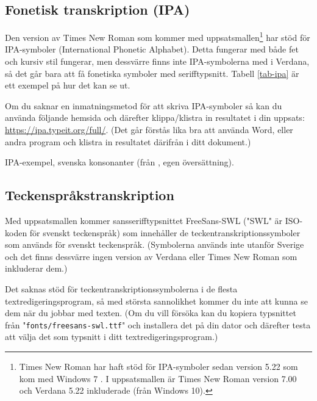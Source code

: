 \subsection{Fonetisk transkription (IPA)}
\label{ipa}

Den version av Times New Roman som kommer med uppsatsmallen\footnote{Times New
  Roman har haft stöd för IPA-symboler sedan version 5.22 \citep{ipa} som kom
  med Windows 7 \citep{win-7-fonts}. I uppsatsmallen är Times New Roman version
  7.00 och Verdana 5.22 inkluderade (från Windows 10).} har stöd för
IPA-symboler (International Phonetic Alphabet). Detta fungerar med både fet och
kursiv stil fungerar, men dessvärre finns inte IPA-symbolerna med i Verdana, så
det går bara att få fonetiska symboler med serifftypsnitt. Tabell
\ref{tab-ipa} är ett exempel på hur det kan se ut.

Om du saknar en inmatningsmetod för att skriva IPA-symboler så kan du använda
följande hemsida och därefter klippa/klistra in resultatet i din uppsats:
\url{https://ipa.typeit.org/full/}. (Det går förstås lika bra att använda Word,
eller andra program och klistra in resultatet därifrån i ditt dokument.)

\begin{table}
  \caption{IPA-exempel, svenska konsonanter (från \citealp[140]{engstrand-1999},
    egen översättning).}
  \label{tab-ipa}
  \vspace{.5em}
  
  \vspace{1em}
\end{table}


\subsection{Teckenspråkstranskription}
\label{teckenspråk}

Med uppsatsmallen kommer sansserifftypsnittet FreeSans-SWL ("SWL" är ISO-koden
för svenskt teckenspråk) som innehåller de teckentranskriptionssymboler som
används för svenskt teckenspråk. (Symbolerna används inte utanför Sverige och
det finns dessvärre ingen version av Verdana eller Times New Roman som
inkluderar dem.)

Det saknas stöd för teckentranskriptionssymbolerna i de flesta
textredigeringsprogram, så med största sannolikhet kommer du inte att kunna se
dem när du jobbar med texten. (Om du vill försöka kan du kopiera typsnittet
från "\texttt{fonts/freesans-swl.ttf}" och installera det på din dator och
därefter testa att välja det som typsnitt i ditt textredigeringsprogram.)


